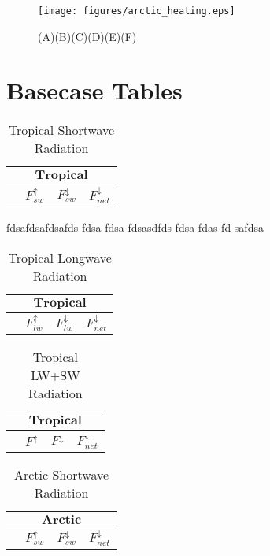 \documentclass[10pt,twocolumn]{article}
\begin{document}
\begin{figure*}[h]
	\centering
	\texttt{[image: figures/arctic\_heating.eps]}
	\caption{(A)(B)(C)(D)(E)(F)}
\end{figure*}


\section{Basecase Tables}

\begin{table}[h]
	\centering
	\caption{Tropical Shortwave Radiation}
	\label{tab:tsr}
	\begin{tabular}{lccc}
		\toprule
		\multicolumn{4}{c}{$\textbf{Tropical}$}\\
		\midrule
		& $F^\uparrow_{sw}$ & $F^\downarrow_{sw}$ & $F^\downarrow_{net}$\\
		\midrule
		
		\bottomrule
	\end{tabular}
\end{table}

fdsafdsafdsafds fdsa fdsa fdsasdfds fdsa fdas fd safdsa

\begin{table}[h]
	\centering
	\caption{Tropical Longwave Radiation}
	\label{tab:tlr}
	\begin{tabular}{lccc}
		\toprule
		\multicolumn{4}{c}{$\textbf{Tropical}$}\\
		\midrule
		& $F^\uparrow_{lw}$ & $F^\downarrow_{lw}$ & $F^\downarrow_{net}$\\
		\midrule
		
		\bottomrule
	\end{tabular}
	
\end{table}

\begin{table}[h]
	\centering
	\caption{Tropical LW+SW Radiation}
	\label{tab:tcr}
	\begin{tabular}{lccc}
		\toprule
		\multicolumn{4}{c}{$\textbf{Tropical}$}\\
		\midrule
		& $F^\uparrow$ & $F^\downarrow$ & $F^\downarrow_{net}$\\
		\midrule
		
		\bottomrule
	\end{tabular}
	
\end{table}


\begin{table}[h]
	\centering
	\caption{Arctic Shortwave Radiation}
	\label{tab:asr}
	\begin{tabular}{lccc}
		\toprule
		\multicolumn{4}{c}{$\textbf{Arctic}$}\\
		\midrule
		& $F^\uparrow_{sw}$ & $F^\downarrow_{sw}$ & $F^\downarrow_{net}$\\
		\midrule
		
		\bottomrule
	\end{tabular}
\end{table}
\end{document}
